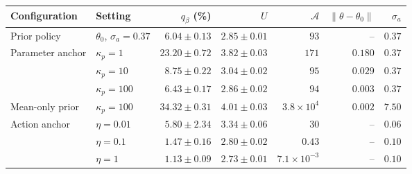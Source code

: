 \setlength{\tabcolsep}{4pt}\begin{tabular}{llrrrrr}
\toprule
Configuration & Setting & $q_\beta$ (\%) & $U$ & $\mathcal A$ & $\|\theta-\theta_0\|$ & $\sigma_a$ \\
\midrule
Prior policy & $\theta_0$, $\sigma_a=0.37$ & $6.04\pm0.13$ & $2.85\pm0.01$ & $93$ & -- & $0.37$ \\
Parameter anchor & $\kappa_p=1$ & $23.20\pm0.72$ & $3.82\pm0.03$ & $171$ & $0.180$ & $0.37$ \\
 & $\kappa_p=10$ & $8.75\pm0.22$ & $3.04\pm0.02$ & $95$ & $0.029$ & $0.37$ \\
 & $\kappa_p=100$ & $6.43\pm0.17$ & $2.86\pm0.02$ & $94$ & $0.003$ & $0.37$ \\
Mean-only prior & $\kappa_p=100$ & $34.32\pm0.31$ & $4.01\pm0.03$ & $3.8\times10^{4}$ & $0.002$ & $7.50$ \\
Action anchor & $\eta=0.01$ & $5.80\pm2.34$ & $3.34\pm0.06$ & $30$ & -- & $0.06$ \\
 & $\eta=0.1$ & $1.47\pm0.16$ & $2.80\pm0.02$ & $0.43$ & -- & $0.10$ \\
 & $\eta=1$ & $1.13\pm0.09$ & $2.73\pm0.01$ & $7.1\times10^{-3}$ & -- & $0.10$ \\
\bottomrule
\end{tabular}
